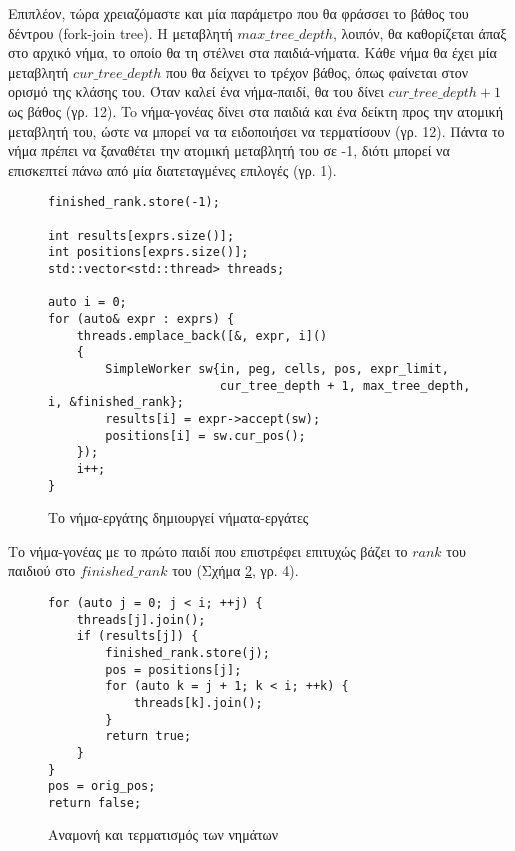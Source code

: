 Επιπλέον, τώρα χρειαζόμαστε και μία παράμετρο που θα φράσσει το βάθος του δέντρου (fork-join tree).
Η μεταβλητή $max\_tree\_depth$, λοιπόν, θα καθορίζεται άπαξ στο αρχικό νήμα, το οποίο θα τη στέλνει στα παιδιά-νήματα.
Κάθε νήμα θα έχει μία μεταβλητή $cur\_tree\_depth$ που θα δείχνει το τρέχον βάθος, όπως φαίνεται στον ορισμό της κλάσης του.
Όταν καλεί ένα νήμα-παιδί, θα του δίνει $cur\_tree\_depth + 1$ ως βάθος (γρ. 12).
To νήμα-γονέας δίνει στα παιδιά και ένα δείκτη προς την ατομική μεταβλητή του, ώστε να μπορεί να τα ειδοποιήσει να τερματίσουν (γρ. 12).
Πάντα το νήμα πρέπει να ξαναθέτει την ατομική μεταβλητή του σε -1, διότι μπορεί να επισκεπτεί πάνω από μία διατεταγμένες επιλογές (γρ. 1).
\begin{figure}[h]
\setlength\partopsep{-\topsep}%
\begin{verbatim}
finished_rank.store(-1);

int results[exprs.size()];
int positions[exprs.size()];
std::vector<std::thread> threads;

auto i = 0;
for (auto& expr : exprs) {
    threads.emplace_back([&, expr, i]()
    {
        SimpleWorker sw{in, peg, cells, pos, expr_limit, 
                        cur_tree_depth + 1, max_tree_depth, i, &finished_rank};
        results[i] = expr->accept(sw);
        positions[i] = sw.cur_pos();
    });
    i++;
}
\end{verbatim}
  \caption{Tο νήμα-εργάτης δημιουργεί νήματα-εργάτες}
\label{fig:rec_top_down_spawn}
\end{figure}

Το νήμα-γονέας με το πρώτο παιδί που επιστρέφει επιτυχώς βάζει το $rank$ του παιδιού στο $finished\_rank$ του (Σχήμα \ref{fig:rec_top_down_join}, γρ. 4). 

\begin{figure}[h]
\setlength\partopsep{-\topsep}%
\begin{verbatim}
for (auto j = 0; j < i; ++j) {
    threads[j].join();
    if (results[j]) {
        finished_rank.store(j);
        pos = positions[j];
        for (auto k = j + 1; k < i; ++k) {
            threads[k].join();
        }
        return true;
    }
}
pos = orig_pos;
return false;
\end{verbatim}
  \caption{Αναμονή και τερματισμός των νημάτων}
\label{fig:rec_top_down_join}
\end{figure}

